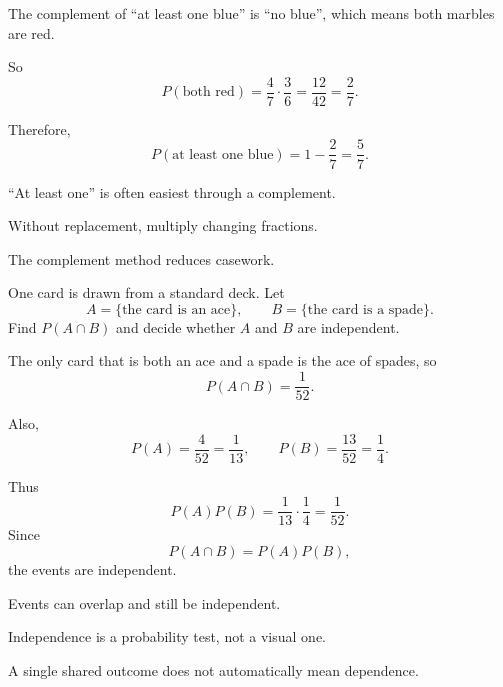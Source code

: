 \begin{solution}
The complement of ``at least one blue'' is ``no blue'', which means both marbles are red.

So
\[
P(\text{both red})=\frac{4}{7}\cdot\frac{3}{6}=\frac{12}{42}=\frac27.
\]

Therefore,
\[
P(\text{at least one blue})=1-\frac27=\frac57.
\]
\end{solution}

\begin{takeaways}
\item ``At least one'' is often easiest through a complement.
\item Without replacement, multiply changing fractions.
\item The complement method reduces casework.
\end{takeaways}

\begin{problem}
One card is drawn from a standard deck. Let
\[
A=\{\text{the card is an ace}\},
\qquad
B=\{\text{the card is a spade}\}.
\]
Find $P(A\cap B)$ and decide whether $A$ and $B$ are independent.
\end{problem}

\begin{solution}
The only card that is both an ace and a spade is the ace of spades, so
\[
P(A\cap B)=\frac1{52}.
\]

Also,
\[
P(A)=\frac4{52}=\frac1{13},
\qquad
P(B)=\frac{13}{52}=\frac14.
\]

Thus
\[
P(A)P(B)=\frac1{13}\cdot\frac14=\frac1{52}.
\]
Since
\[
P(A\cap B)=P(A)P(B),
\]
the events are independent.
\end{solution}

\begin{takeaways}
\item Events can overlap and still be independent.
\item Independence is a probability test, not a visual one.
\item A single shared outcome does not automatically mean dependence.
\end{takeaways}
